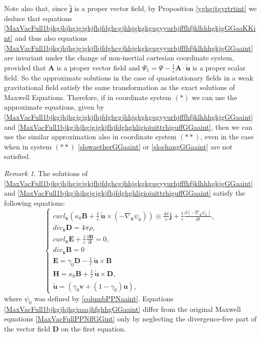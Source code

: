 \documentclass{article}
\theoremstyle{definition}
\theoremstyle{remark}
\newtheorem{remark}{Remark}[section]
\renewcommand{\vec}[1]{\mathbf{#1}}
\newcommand{\er}{\eqref}
\newcommand{\er}{\eqref}
\newtheorem{remark}{Remark}
\begin{document}
Note also that, since $\vec {\widetilde j}$ is a proper vector
field, by Proposition \ref{yghgjtgyrtrtint} we deduce that equations
\er{MaxVacFull1bjkgjhjhgjgjgkjfhjfdghcgjhhjgkgkgugyyurhjfffhfjklhhhgkjgGGaaKKint}
and thus also equations
\er{MaxVacFull1bjkgjhjhgjgjgkjfhjfdghcgjhhjgkgkgugyyurhjfffhfjklhhhgkjgGGaaint}
are invariant under the change of non-inertial cartesian coordinate
system, provided that $\vec A$ is a proper vector field and
$\Psi_1=\Psi-\frac{1}{c}\vec A\cdot\vec {\tilde u}$ is a proper
scalar field. So the approximate solutions in the case of
quasistationary fields in a weak gravitational field satisfy the
same transformation as the exact solutions of Maxwell Equations.
Therefore, if in coordinate system $(*)$ we can use the approximate
equations, given by
\er{MaxVacFull1bjkgjhjhgjgjgkjfhjfdghcgjhhjgkgkgugyyurhjfffhfjklhhhgkjgGGaaint}
and
\er{MaxVacFull1bjkgjhjhgjgjgkjfhjfdghghligioiuittrhiguffGGaaint},
then we can use the similar approximation
also in coordinate system $(**)$, even in the case when in system
$(**)$ \er{slowaetherGGaaint} or \er{slochangGGaaint} are not
satisfied.
\begin{remark}
The solutions of
\er{MaxVacFull1bjkgjhjhgjgjgkjfhjfdghcgjhhjgkgkgugyyurhjfffhfjklhhhgkjgGGaaint}
and \er{MaxVacFull1bjkgjhjhgjgjgkjfhjfdghghligioiuittrhiguffGGaaint}
satisfy the following equations:
\begin{equation}\label{MaxVacFull1bjkgjhjhgjaaajhfghhgGGaaint}
\begin{cases}
curl_{\vec x} \left(\kappa_0\vec B+\frac{1}{c}\,\vec {\tilde
u}\times \left(- \nabla_{\vec x}\psi_0\right)\right)\equiv
\frac{4\pi}{c}\vec j+\frac{1}{c}\frac{\partial (-
\nabla_{\vec x}\psi_0)}{\partial t},\\
div_{\vec x} \vec D=4\pi\rho,\\
curl_{\vec x} \vec E+\frac{1}{c}\frac{\partial \vec B}{\partial t}=0,\\
div_{\vec x} \vec B=0\\
\vec E=\gamma_0\vec D-\frac{1}{c}\,\vec {\tilde u}\times \vec B\\
\vec H=\kappa_0\vec B+\frac{1}{c}\,\vec {\tilde u}\times \vec D,\\
\vec {\tilde u}=\left(\gamma_0\vec v+(1-\gamma_0)\vec u\right),
\end{cases}
\end{equation}
where $\psi_0$ was defined by \er{columbPPNaaint}. Equations
\er{MaxVacFull1bjkgjhjhgjaaajhfghhgGGaaint} differ from the original
Maxwell equations \er{MaxVacFullPPNffGGint} only by neglecting the
divergence-free part of the vector field $\vec D$ on the first
equation.
\end{remark}
\end{document}
